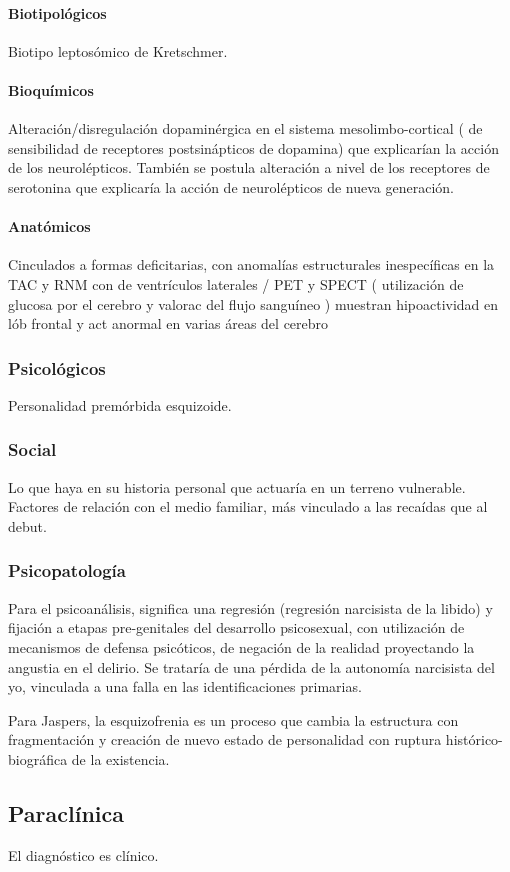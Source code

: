 \paragraph*{Biotipológicos}
Biotipo leptosómico de Kretschmer.
\paragraph*{Bioquímicos}
Alteración/disregulación dopaminérgica en el sistema mesolimbo-cortical ( de sensibilidad de receptores postsinápticos de dopamina) que explicarían la acción de los neurolépticos. También se postula alteración a nivel de los receptores de serotonina que explicaría la acción de neurolépticos de nueva generación.
\paragraph*{Anatómicos}
Cinculados a formas deficitarias, con anomalías estructurales inespecíficas en la TAC y RNM con de ventrículos laterales / PET y SPECT ( utilización de glucosa por el cerebro y valorac del flujo sanguíneo ) muestran hipoactividad en lób frontal y act anormal en varias áreas del cerebro
\subsubsection*{Psicológicos}
Personalidad premórbida esquizoide.
\subsubsection*{Social}
Lo que haya en su historia personal que actuaría en un terreno vulnerable. Factores de relación con el medio familiar, más vinculado a las recaídas que al debut.
\subsubsection*{Psicopatología}
Para el psicoanálisis, significa una regresión (regresión narcisista de la libido) y fijación a etapas pre-genitales del desarrollo psicosexual, con utilización de mecanismos de defensa psicóticos, de negación de la realidad proyectando la angustia en el delirio. Se trataría de una pérdida de la autonomía narcisista del yo, vinculada a una falla en las identificaciones primarias.

Para Jaspers, la esquizofrenia es un proceso que cambia la estructura con fragmentación y creación de nuevo estado de personalidad con ruptura histórico-biográfica de la existencia.
\subsection*{Paraclínica}
El diagnóstico es clínico.
